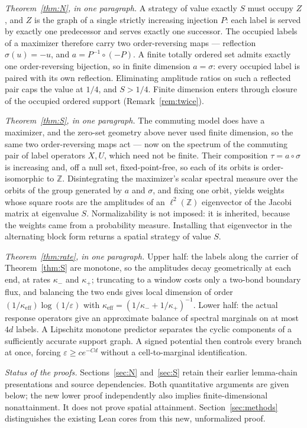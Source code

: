 \documentclass[11pt]{article}
\theoremstyle{remark}
\newcommand{\keff}{\kappa_{\mathrm{eff}}}
\newcommand{\eps}{\varepsilon}
\begin{document}
\emph{Theorem~\ref{thm:N}, in one paragraph.} A strategy of value exactly
$S$ must occupy $Z$, and $Z$ is the graph of a single strictly increasing
injection $P$: each label is served by exactly one predecessor and serves
exactly one successor. The occupied labels of a maximizer therefore carry
two order-reversing maps --- reflection $\sigma(u)=-u$, and
$a=P^{-1}\circ(-P)$. A finite totally ordered set admits exactly one
order-reversing bijection, so in finite dimension $a=\sigma$: every occupied
label is paired with its own reflection. Eliminating amplitude ratios on
such a reflected pair caps the value at $1/4$, and $S>1/4$. Finite dimension
enters through closure of the occupied ordered support
(Remark~\ref{rem:twice}).

\emph{Theorem~\ref{thm:S}, in one paragraph.} The commuting model does have
a maximizer, and the zero-set geometry above never used finite dimension, so
the same two order-reversing maps act --- now on the spectrum of the
commuting pair of label operators $X,U$, which need not be finite. Their
composition $\tau=a\circ\sigma$ is increasing and, off a null set,
fixed-point-free, so each of its orbits is order-isomorphic to
$\mathbb{Z}$. Disintegrating the maximizer's scalar spectral measure over
the orbits of the group generated by $a$ and $\sigma$, and fixing one orbit,
yields weights whose square roots are the amplitudes of an
$\ell^2(\mathbb{Z})$ eigenvector of the Jacobi matrix at eigenvalue $S$.
Normalizability is not imposed: it is inherited, because the weights came
from a probability measure. Installing that eigenvector in the alternating
block form returns a spatial strategy of value $S$.

\emph{Theorem~\ref{thm:rate}, in one paragraph.} Upper half: the labels
along the carrier of Theorem~\ref{thm:S} are monotone, so the amplitudes
decay geometrically at each end, at rates $\kappa_-$ and $\kappa_+$;
truncating to a window costs only a two-bond boundary flux, and balancing
the two ends gives local dimension of order $(1/\keff)\log(1/\eps)$ with
$\keff=(1/\kappa_-+1/\kappa_+)^{-1}$. Lower half: the actual response operators give an approximate balance
of spectral marginals on at most $4d$ labels. A Lipschitz monotone
predictor separates the cyclic components of a sufficiently accurate
support graph. A signed potential then controls every branch at once,
forcing $\eps\ge c e^{-Cd}$ without a cell-to-marginal identification.

\emph{Status of the proofs.} Sections~\ref{sec:N} and~\ref{sec:S} retain
their earlier lemma-chain presentations and source dependencies. Both
quantitative arguments are given below; the new lower proof independently
also implies finite-dimensional nonattainment. It does not prove spatial
attainment. Section~\ref{sec:methods} distinguishes the existing Lean
cores from this new, unformalized proof.
\end{document}
